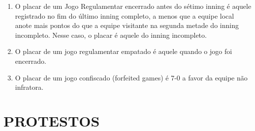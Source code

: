 \begin{multicols}{2}
\begin{enumerate}[label=\alph*)]
	\item O placar de um Jogo Regulamentar encerrado antes do s\'etimo \gls{inning} \'e aquele registrado no fim do \'ultimo \gls{inning} completo, a menos que a equipe local anote mais pontos do que a equipe visitante na segunda metade do \gls{inning} incompleto. Nesse caso, o placar \'e aquele do \gls{inning} incompleto. 

	\item  O placar de um jogo regulamentar empatado \'e aquele quando o jogo foi encerrado. 

	\item  O placar de um jogo confiscado (\glspl{forfeited game}) \'e 7-0 a favor da equipe n\~ao infratora. 
	\end{enumerate}

\end{multicols}

\section{PROTESTOS}

